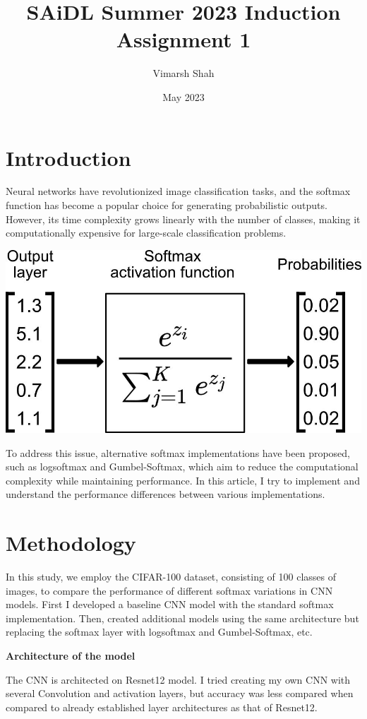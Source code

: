 \documentclass{article}
\title{SAiDL Summer 2023 Induction Assignment 1}
\author{Vimarsh Shah }
\date{May 2023}
\begin{document}
\maketitle

\section{Introduction}


Neural networks have revolutionized image classification tasks, and the softmax function has become a popular choice for generating probabilistic outputs. However, its time complexity grows linearly with the number of classes, making it computationally expensive for large-scale classification problems.

\vspace{6pt} \vspace{6pt}
\includegraphics[width=0.6\linewidth]{images/softmaxworkingsimple.jpg}
\vspace{6pt}

To address this issue, alternative softmax implementations have been proposed, such as logsoftmax and Gumbel-Softmax, which aim to reduce the computational complexity while maintaining performance. In this article, I try to implement and understand the performance differences between various implementations.

\section{Methodology}


In this study, we employ the CIFAR-100 dataset, consisting of 100 classes of images, to compare the performance of different softmax variations in CNN models. First I developed a baseline CNN model with the standard softmax implementation. Then, created additional models using the same architecture but replacing the softmax layer with logsoftmax and Gumbel-Softmax, etc.

\textbf{Architecture of the model}


The CNN is architected on Resnet12 model. I tried creating my own CNN with several Convolution and activation layers, but accuracy was less compared when compared to already established layer architectures as that of Resnet12.
\end{document}
